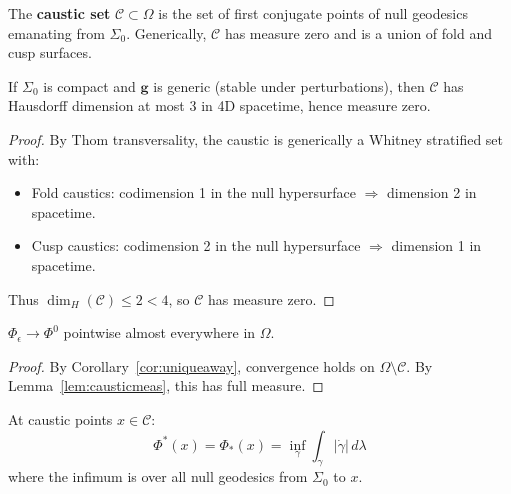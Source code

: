 \begin{definition}
The \textbf{caustic set} $\mathcal{C} \subset \Omega$ is the set of first conjugate points of null geodesics emanating from $\Sigma_0$. Generically, $\mathcal{C}$ has measure zero and is a union of fold and cusp surfaces.
\end{definition}

\begin{lemma}\label{lem:causticmeas}
If $\Sigma_0$ is compact and $\mathbf{g}$ is generic (stable under perturbations), then $\mathcal{C}$ has Hausdorff dimension at most 3 in 4D spacetime, hence measure zero.
\end{lemma}

\begin{proof}
By Thom transversality, the caustic is generically a Whitney stratified set with:
\begin{itemize}
    \item Fold caustics: codimension 1 in the null hypersurface $\Rightarrow$ dimension 2 in spacetime.
    \item Cusp caustics: codimension 2 in the null hypersurface $\Rightarrow$ dimension 1 in spacetime.
\end{itemize}
Thus $\dim_H(\mathcal{C}) \leq 2 < 4$, so $\mathcal{C}$ has measure zero.
\end{proof}

\begin{theorem}\label{thm:aeconv}
$\Phi_\epsilon \to \Phi^0$ pointwise almost everywhere in $\Omega$.
\end{theorem}

\begin{proof}
By Corollary~\ref{cor:uniqueaway}, convergence holds on $\Omega \setminus \mathcal{C}$. By Lemma~\ref{lem:causticmeas}, this has full measure.
\end{proof}

\begin{lemma}\label{lem:semicont}
At caustic points $x \in \mathcal{C}$:
\[
\Phi^*(x) = \Phi_*(x) = \inf_\gamma \int_\gamma |\dot\gamma| \, d\lambda
\]
where the infimum is over all null geodesics from $\Sigma_0$ to $x$.
\end{lemma}

